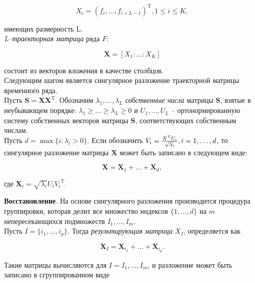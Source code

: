 \documentclass[specialist,
			   substylefile = spbu_report.rtx,
			   subf,href,colorlinks=true, 12pt]{disser}
\begin{document}
\begin{equation*}
	X_i = (f_{i}, \dots, f_{i + L - 1})^\mathrm{T}, 1 \leq i \leq K,
\end{equation*}

имеющих размерность L. \\

\textit{L–траекторная матрица} ряда $F$:

\begin{equation*}
	\mathbf{X} = [X_1: \dots: X_K]
\end{equation*}

состоит из векторов вложения в качестве столбцов.\\

Следующим шагом является сингулярное разложение траекторной матрицы временного ряда.\\

Пусть $\mathbf{S} = \mathbf{XX}^\mathrm{T}$. Обозначим $\lambda_1, \dots, \lambda_L$ \textit{собственные числа} матрицы $\mathbf{S}$, взятые в неубывающем порядке: $\lambda_1 \geq \dots \geq \lambda_L \geq 0$ и $U_1, \dots, U_L$ – ортонормированную систему собственных векторов матрицы $\mathbf{S}$, соответствующих собственным числам.\\

Пусть $d = \max\{i: \lambda_i > 0\}$. Если обозначить $V_i = {X^\mathrm{T} U_i \over \sqrt{\lambda_i}}, i = 1, \dots, d$, то сингулярное разложение матрицы $\mathbf{X}$ может быть записано в следующем виде:

\begin{equation*}
	\mathbf{X} = \mathbf{X}_1 + \dots + \mathbf{X}_d,
\end{equation*}

где $\mathbf{X}_i = \sqrt{\lambda_i} U_i {V_i}^\mathrm{T}$.



\textbf{Восстановление}. На основе сингулярного разложения производится процедура группировки, которая делит все множество индексов $\{1, \dots, d\}$ на $m$ непересекающихся подмножеств $I_1, \dots, I_m$.\\

Пусть $I = \{i_1, \dots, i_p\}$. Тогда \textit{результирующая матрица} $X_I$, определяется как

\begin{equation*}
	\mathbf{X}_I = \mathbf{X}_{i_1} + \dots +  \mathbf{X}_{i_p}. 
\end{equation*}

Такие матрицы вычисляются для $I = I_1, \dots, I_m$, и разложение может быть записано в сгруппированном виде
\end{document}
